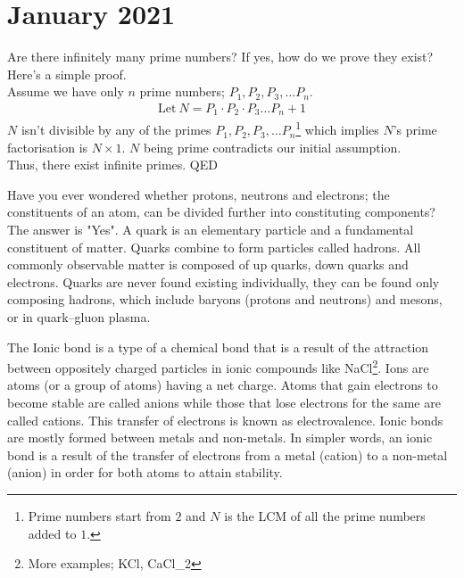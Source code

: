 \section{January 2021}
\begin{mathbox}{}
{Are there infinitely many prime numbers? If yes, how do we prove they exist?\\
Here's a simple proof.\\
{Assume} we have only $n$ prime numbers; $P_1, P_2, P_3, \dots P_n$.
\begin{align*}
\text{Let}~N = P_1 \cdot P_2 \cdot P_3 \dots P_n + 1
\end{align*}
$N$ {isn't divisible} by any of the primes $P_1, P_2, P_3, \dots P_n$\footnote{Prime numbers start from $2$ and $N$ is the LCM of all the prime numbers added to $1$.}  which implies $N$'s {prime factorisation} is $N \times 1$. $N$ being prime {contradicts} our initial assumption.\\
Thus, there exist infinite primes. QED}
\end{mathbox}
\begin{phybox}{}
{Have you ever wondered whether {protons, neutrons and electrons; the constituents of an atom,} can be {divided further} into constituting components? The answer is {"Yes"}. A {quark} is an elementary particle and a fundamental constituent of matter. Quarks combine to form particles called hadrons. All commonly observable matter is composed of {up quarks, down quarks and electrons}. Quarks are never found existing individually, they can be found only composing {hadrons}, which include {baryons} (protons and neutrons) and {mesons}, or in {quark–gluon plasma}.}
\end{phybox}
\begin{chembox}{}
{The {Ionic bond} is a type of a {chemical bond} that is a result of the attraction {between oppositely charged particles} in ionic compounds like NaCl\footnote{More examples; KCl, CaCl_2}. Ions are atoms (or a group of atoms) having a {net charge}. Atoms that {gain electrons} to become {stable} are called {anions} while those that {lose electrons} for the same are called {cations}. This {transfer of electrons} is known as {electrovalence}. Ionic bonds are {mostly} formed {between metals and non-metals}. In simpler words, an ionic bond is a result of the transfer of electrons from a metal (cation) to a non-metal (anion) in order for both atoms to attain stability.}
\end{chembox}
